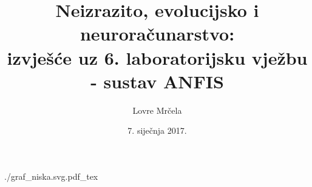 \documentclass [12pt, a4paper]{article}
\title {Neizrazito, evolucijsko i neuroračunarstvo:\\izvješće uz 6. laboratorijsku vježbu - sustav ANFIS}
\author {Lovre Mrčela}
\date {7. siječnja 2017.}
\begin{document}
\pagestyle {empty}\begin {center}\def \svgwidth {0.99\textwidth } {./}{graf_niska.svg.pdf_tex}\end {center}
\end{document}
